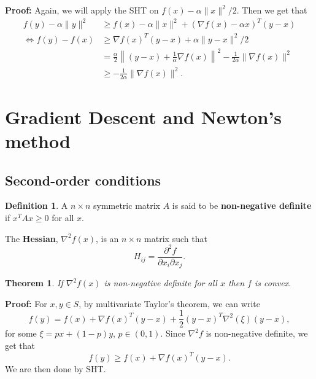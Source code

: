 \documentclass[12pt]{article}
\newtheorem{theorem}{Theorem}[section]
\theoremstyle{definition}
\newtheorem{definition}{Definition}[section]
\theoremstyle{remark}
\begin{document}
\begin{adjustbox}{minipage = \columnwidth - 25.5pt, margin=1em, frame=1pt, margin=0em}
	\textbf{Proof:} Again, we will apply the SHT on $f(x) - \alpha \|x\|^2 / 2$. Then we get that
	\begin{align*}
		f(y) - \alpha \|y\|^2 &\geq f(x) - \alpha \|x\|^2 + (\nabla f(x) - \alpha x)^{T}(y - x) \\
		\iff f(y) - f(x) &\geq \nabla f(x)^{T}(y - x) + \alpha \|y - x\|^2/2 \\
				 &= \frac{\alpha}{2} \left\|(y - x) + \frac{1}{\alpha} \nabla f(x) \right\|^2 - \frac{1}{2 \alpha} \|\nabla f(x) \|^2 \\
				 &\geq - \frac{1}{2 \alpha} \|\nabla f(x) \|^2.
	\end{align*}
\end{adjustbox}

\newpage

\section{Gradient Descent and Newton's method}%
\label{sec:gradient_descent_and_newton_s_method}

\subsection{Second-order conditions}%
\label{sub:second_order_conditions}

\begin{definition}
	A $n \times n$ symmetric matrix $A$ is said to be \textbf{non-negative definite} if $x^{T}Ax \geq 0$ for all $x$.
\end{definition}

The \textbf{Hessian}, $\nabla^2 f(x)$, is an $n \times n$ matrix such that
\[
H_{ij} = \frac{\partial^2 f}{\partial x_i \partial x_j}
.\]

\begin{theorem}
\label{thm:hess-convex}
	If $\nabla^2 f(x)$ is non-negative definite for all $x$ then $f$ is convex.
\end{theorem}

\begin{adjustbox}{minipage = \columnwidth - 25.5pt, margin=1em, frame=1pt, margin=0em}
\textbf{Proof:} For $x, y \in S$, by multivariate Taylor's theorem, we can write
\[
	f(y) = f(x) + \nabla f(x)^{T} (y - x) + \frac{1}{2} (y - x)^{T} \nabla^2 (\xi) (y - x)
,\]
for some $\xi = px + (1 - p)y$, $p \in (0, 1)$. Since $\nabla^2 f$ is non-negative definite, we get that
\[
	f(y) \geq f(x) + \nabla f(x)^{T} (y - x)
.\]
We are then done by SHT.
\end{adjustbox}
\end{document}
